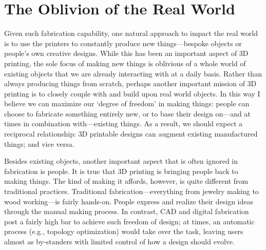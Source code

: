 \section{The Oblivion of the Real World}
Given such fabrication capability, one natural approach to impact the real world is to use the printers to constantly produce new things---bespoke objects or people's own creative designs. While this has been an important aspect of 3D printing, the sole focus of making new things is oblivious of a whole world of existing objects that we are already interacting with at a daily basis. Rather than always producing things from scratch, perhaps another important mission of 3D printing is to closely couple with and build upon real world objects. In this way I believe we can maximize our `degree of freedom' in making things: people can choose to fabricate something entirely new, or to base their design on---and at times in combination with---existing things. As a result, we should expect a reciprocal relationship: 3D printable designs can augment existing manufactured things; and vice versa.

Besides existing objects, another important aspect that is often ignored in fabrication is people. It is true that 3D printing is bringing people back to making things. The kind of making it affords, however, is quite different from traditional practices. Traditional fabrication---everything from jewelry making to wood working---is fairly hands-on. People express and realize their design ideas through the manual making process.
In contrast, CAD and digital fabrication post a fairly high bar to achieve such freedom of design; at times, an automatic process (e.g., topology optimization) would take over the task, leaving users almost as by-standers with limited control of how a design should evolve.

